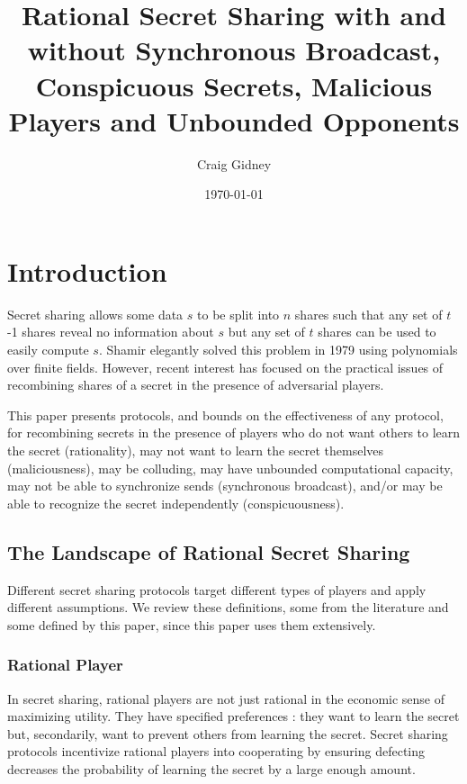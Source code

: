 \documentclass{dalcsthesis}
\title{Rational Secret Sharing with and without Synchronous Broadcast, Conspicuous Secrets, Malicious Players and Unbounded Opponents}
\author{Craig Gidney}
\date{\today}
\begin{document}
\mcs
\maketitle

\chapter{Introduction}

Secret sharing allows some data $s$ to be split into $n$ shares such that any set of $t$-1 shares reveal no information about $s$ but any set of $t$ shares can be used to easily compute $s$. Shamir \cite{shamir79} elegantly solved this problem in 1979 using polynomials over finite fields. However, recent interest \cite{fuch10, ong09, kol08, maleka08, abraham06, gordon06} has focused on the practical issues of recombining shares of a secret in the presence of adversarial players.

This paper presents protocols, and bounds on the effectiveness of any protocol, for recombining secrets in the presence of players who do not want others to learn the secret (rationality), may not want to learn the secret themselves (maliciousness), may be colluding, may have unbounded computational capacity, may not be able to synchronize sends (synchronous broadcast), and/or may be able to recognize the secret independently (conspicuousness).

\section{The Landscape of Rational Secret Sharing}

Different secret sharing protocols target different types of players and apply different assumptions. We review these definitions, some from the literature and some defined by this paper, since this paper uses them extensively.

\subsection{Rational Player}

In secret sharing, rational players are not just rational in the economic sense of maximizing utility. They have specified preferences \cite{halpern04}: they want to learn the secret but, secondarily, want to prevent others from learning the secret. Secret sharing protocols incentivize rational players into cooperating by ensuring defecting decreases the probability of learning the secret by a large enough amount.
\end{document}
